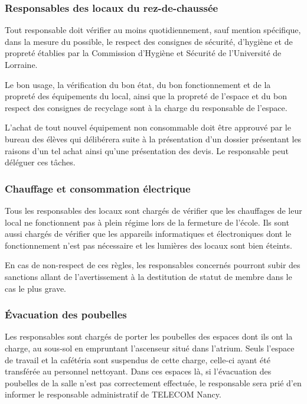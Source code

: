 \documentclass{article} %
\begin{document}
			\subsubsection{Responsables des locaux du rez-de-chaussée}
\label{ssub:responsables_des_locaux_du_rez_de_chaussee}

				Tout responsable doit vérifier au moins quotidiennement, sauf
				mention spécifique, dans la mesure du possible, le respect des
				consignes de sécurité, d’hygiène et de propreté établies par la
				Commission d’Hygiène et Sécurité de l’Université de Lorraine.

				Le bon usage, la vérification du bon état, du bon
				fonctionnement et de la propreté des équipements du local, ainsi
				que la propreté de l’espace et du bon respect des consignes de
				recyclage sont à la charge du responsable de l’espace.

				L’achat de tout nouvel équipement non consommable doit être
				approuvé par le bureau des élèves qui délibérera suite à la
				présentation d’un dossier présentant les raisons d’un tel achat
				ainsi qu’une présentation des devis. Le responsable peut
				déléguer ces tâches.

			\subsubsection{Chauffage et consommation électrique}
\label{ssub:chauffage_et_consommation_electrique}

				Tous les responsables des locaux sont chargés de vérifier que
				les chauffages de leur local ne fonctionnent pas à plein régime
				lors de la fermeture de l’école. Ils sont aussi chargés de
				vérifier que les appareils informatiques et électroniques dont
				le fonctionnement n’est pas nécessaire et les lumières des
				locaux sont bien éteints.

				En cas de non-respect de ces règles, les responsables concernés
				pourront subir des sanctions allant de l’avertissement à la
				destitution de statut de membre dans le cas le plus grave.

			\subsubsection{Évacuation des poubelles}
\label{ssub:evacuation_des_poubelles}

				Les responsables sont chargés de porter les poubelles des
				espaces dont ils ont la charge, au sous-sol en empruntant
				l’ascenseur situé dans l’atrium. Seuls l’espace de travail et la
				cafétéria sont suspendus de cette charge, celle-ci ayant été
				transférée au personnel nettoyant. Dans ces espaces là, si
				l’évacuation des poubelles de la salle n’est pas correctement
				effectuée, le responsable sera prié d’en informer le responsable
				administratif de TELECOM Nancy.
\end{document}
